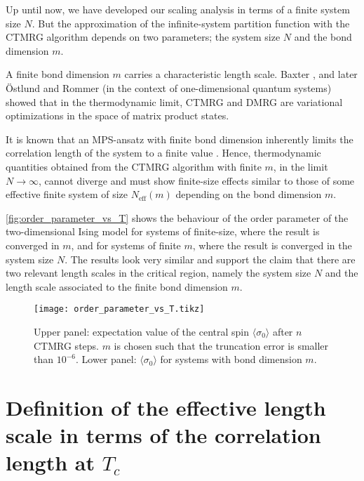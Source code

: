 
Up until now, we have developed our scaling analysis in terms of a finite system size $N$.
But the approximation of the infinite-system partition function with the CTMRG algorithm depends on two parameters;
the system size $N$ and the bond dimension $m$.

A finite bond dimension $m$ carries a characteristic length scale.
Baxter \cite{baxter1978variational}, and later Östlund and Rommer \cite{ostlund1995thermodynamic} (in the context of
one-dimensional quantum systems) showed that in the thermodynamic limit,
CTMRG and DMRG are variational optimizations in the space of matrix product states.

It is known that an MPS-ansatz with finite bond dimension inherently limits the
correlation length of the system to a finite value \cite{wolf2006quantum, rommer1997class}. Hence,
thermodynamic quantities obtained from the CTMRG algorithm with finite $m$, in the limit
$N \to \infty$, cannot diverge and must show finite-size effects similar to those of some
effective finite system of size $N_{\text{eff}}(m)$ depending on the bond dimension $m$.

\autoref{fig:order_parameter_vs_T} shows the behaviour of the order parameter of the
two-dimensional Ising model for systems of finite-size,
where the result is converged in $m$, and for systems of finite $m$, where
the result is converged in the system size $N$. The results look very similar and support
the claim that there are two relevant length scales in the critical region, namely the system size $N$ and
the length scale associated to the finite bond dimension $m$.

\begin{figure}
\texttt{[image: order\_parameter\_vs\_T.tikz]}
\caption{Upper panel: expectation value of the central spin $\langle \sigma_0 \rangle$
  after $n$ CTMRG steps. $m$ is chosen such that the truncation error is smaller than
  $10^{-6}$. Lower panel: $\langle \sigma_0 \rangle$ for systems with bond dimension $m$.}\label{fig:order_parameter_vs_T}
\end{figure}

\section{Definition of the effective length scale in terms of the correlation length at $T_c$}\label{sec:definition_effective_length_scale_in_terms_of_xi}

